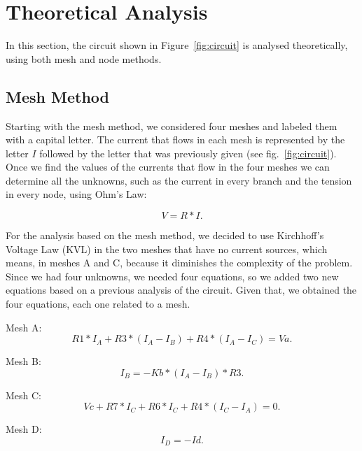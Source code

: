 \section{Theoretical Analysis}
\label{sec:analysis}

In this section, the circuit shown in Figure~\ref{fig:circuit} is analysed theoretically, using both mesh and node methods.

\subsection{Mesh Method}

Starting with the mesh method, we considered four meshes and labeled them with a capital letter. The current that flows in each mesh is represented by the letter $I$ followed by the letter that was previously given (see fig.~\ref{fig:circuit}). Once we find the values of the currents that flow in the four meshes we can determine all the unknowns, such as the current in every branch and the tension in every node, using Ohm’s Law:

\begin{equation}
  V= R*I.
  \label{eq:ohm_law}
\end{equation}

For the analysis based on the mesh method, we decided to use Kirchhoff’s Voltage Law (KVL) in the two meshes that have no current sources, which means, in meshes A and C, because it diminishes the complexity of the problem. Since we had four unknowns, we needed four equations, so we added two new equations based on a previous analysis of the circuit. Given that, we obtained the four equations, each one related to a mesh.

Mesh A:
\begin{equation}
  R1*I_A + R3*(I_A-I_B) + R4*(I_A-I_C) = Va.
  \label{eq:mesh_a}
\end{equation}

Mesh B:
\begin{equation}
  I_B = -Kb*(I_A-I_B)*R3.
  \label{eq:mesh_b}
\end{equation}

Mesh C:
\begin{equation}
  Vc + R7*I_C + R6*I_C + R4*(I_C-I_A) = 0.
  \label{eq:mesh_c}
\end{equation}

Mesh D:
\begin{equation}
  I_D = -Id.
  \label{eq:mesh_d}
\end{equation}


